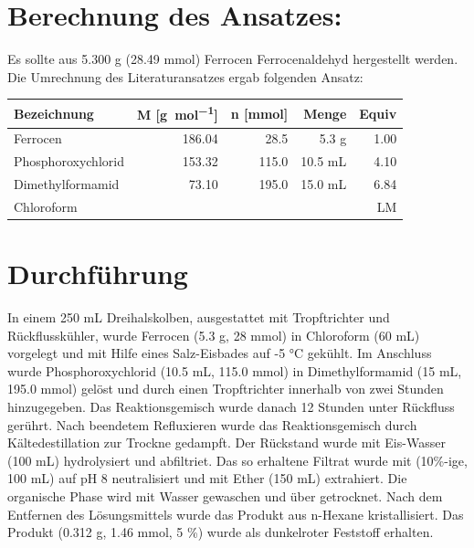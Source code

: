 \documentclass[12pt]{article}
\begin{document}
\begin{onehalfspace}

\section{Berechnung des Ansatzes: }
Es sollte aus 5.300 g (28.49 \si{\milli\mol}) Ferrocen Ferrocenaldehyd hergestellt werden.
Die Umrechnung des Literaturansatzes\cite{bio} ergab folgenden Ansatz:\\[0.5cm]
\begin{tabular}{lrrrr}
\toprule
\textbf{Bezeichnung}&\textbf{ M [\si{\gram\per\mol}]} & \textbf{n [\si{\milli\mol}]} & \textbf{Menge} & \textbf{Equiv}\\
\midrule
Ferrocen & 186.04 & 28.5  &  5.3 \si{\gram} &1.00   \\
Phosphoroxychlorid  & 153.32 & 115.0  & 10.5 \si{\milli\liter} & 4.10   \\
Dimethylformamid     & 73.10  & 195.0  & 15.0 \si{\milli\liter} & 6.84   \\
Chloroform     &  &  &  & LM   \\
\bottomrule
\end{tabular}

\normalsize \section{Durchführung \cite{bio}}
In einem 250 \si{\milli\liter} Dreihalskolben, ausgestattet mit Tropftrichter und Rückflusskühler, wurde Ferrocen (5.3 g, 28 \si{\milli\mol}) in Chloroform (60 \si{\milli\liter}) vorgelegt und mit Hilfe eines Salz-Eisbades auf -5 \si{\celsius} gekühlt. Im Anschluss wurde Phosphoroxychlorid (10.5 \si{\milli\liter}, 115.0 \si{\milli\mol}) in Dimethylformamid (15 \si{\milli\liter}, 195.0 \si{\milli\mol}) gelöst und durch einen Tropftrichter innerhalb von zwei Stunden  hinzugegeben. Das Reaktionsgemisch wurde danach 12 Stunden unter Rückfluss gerührt. Nach beendetem Refluxieren wurde das Reaktionsgemisch durch Kältedestillation zur Trockne gedampft. Der Rückstand wurde mit Eis-Wasser (100 \si{\milli\liter}) hydrolysiert und abfiltriet. Das so erhaltene Filtrat wurde mit  (10\%-ige, 100 \si{\milli\liter}) auf pH 8 neutralisiert und mit Ether (150 \si{\milli\liter}) extrahiert. Die organische Phase wird mit Wasser gewaschen und über  getrocknet. Nach dem Entfernen des Lösungsmittels wurde das Produkt aus n-Hexane kristallisiert. Das Produkt (0.312 \si{\gram}, 1.46 \si{\milli\mol}, 5 \%) wurde als dunkelroter Feststoff erhalten.


\end{onehalfspace}
\end{document}
